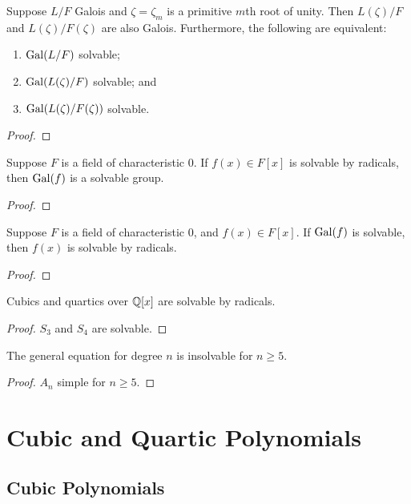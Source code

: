 \begin{lemma}
    Suppose \(L/F\) Galois and \(\zeta = \zeta_m\) is a primitive \(m\)th root of unity.
    Then \(L(\zeta)/F\) and \(L(\zeta)/F(\zeta)\) are also Galois.
    Furthermore, the following are equivalent:
    \begin{enumerate}[label={(\alph*)}, itemsep=0mm]
        \item \(\operatorname{Gal}(L/F)\) solvable;
        \item \(\operatorname{Gal}(L(\zeta)/F)\) solvable; and
        \item \(\operatorname{Gal}(L(\zeta)/F(\zeta))\) solvable.
    \end{enumerate}
\end{lemma}
\begin{proof}
\end{proof}

\begin{theorem}
    Suppose \(F\) is a field of characteristic 0.
    If \(f(x) \in F[x]\) is solvable by radicals,
    then \(\operatorname{Gal}(f)\) is a solvable group.
\end{theorem}
\begin{proof}
\end{proof}
\begin{theorem}[Galois]
    Suppose \(F\) is a field of characteristic 0,
    and \(f(x) \in F[x]\).
    If \(\operatorname{Gal}(f)\) is solvable, then \(f(x)\) is solvable by radicals.
\end{theorem}
\begin{proof}
\end{proof}
\begin{corollary}
    Cubics and quartics over \(\mathbb{Q}[x]\) are solvable by radicals.
\end{corollary}
\begin{proof}
    \(S_3\) and \(S_4\) are solvable.
\end{proof}
\begin{corollary}
    The general equation for degree \(n\) is insolvable for \(n \geq 5\).
\end{corollary}
\begin{proof}
    \(A_n\) simple for \(n \geq 5\).
\end{proof}


\section{Cubic and Quartic Polynomials}

\subsection*{Cubic Polynomials}


